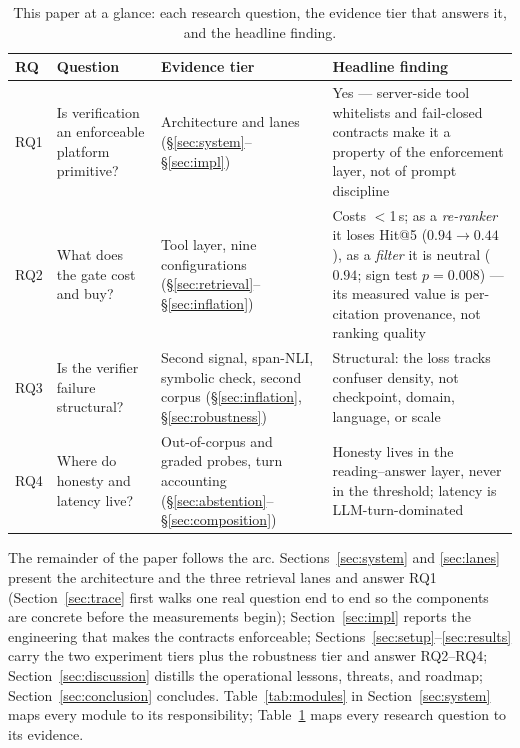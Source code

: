 \begin{table}[!htbp]
\centering
\footnotesize
\setlength{\tabcolsep}{3pt}
\caption{This paper at a glance: each research question, the evidence tier
that answers it, and the headline finding.}
\label{tab:ataglance}
\begin{tabular}{p{0.75cm}p{4.0cm}p{2.6cm}p{5.3cm}}
\toprule
RQ & Question & Evidence tier & Headline finding \\
\midrule
RQ1 & Is verification an enforceable platform primitive? & Architecture and
lanes (\S\ref{sec:system}--\S\ref{sec:impl}) & Yes --- server-side tool
whitelists and fail-closed contracts make it a property of the enforcement
layer, not of prompt discipline \\
RQ2 & What does the gate cost and buy? & Tool layer, nine configurations
(\S\ref{sec:retrieval}--\S\ref{sec:inflation}) & Costs $<$1\,s; as a
\emph{re-ranker} it loses Hit@5 ($0.94\!\to\!0.44$), as a \emph{filter} it is
neutral ($0.94$; sign test $p=0.008$) --- its measured value is per-citation
provenance, not ranking quality \\
RQ3 & Is the verifier failure structural? & Second signal, span-NLI, symbolic
check, second corpus (\S\ref{sec:inflation}, \S\ref{sec:robustness}) &
Structural: the loss tracks confuser density, not checkpoint, domain,
language, or scale \\
RQ4 & Where do honesty and latency live? & Out-of-corpus and graded probes,
turn accounting (\S\ref{sec:abstention}--\S\ref{sec:composition}) & Honesty
lives in the reading--answer layer, never in the threshold; latency is
LLM-turn-dominated \\
\bottomrule
\end{tabular}
\end{table}

The remainder of the paper follows the arc.
Sections~\ref{sec:system} and \ref{sec:lanes} present the architecture and
the three retrieval lanes and answer RQ1 (Section~\ref{sec:trace} first walks
one real question end to end so the components are concrete before the
measurements begin); Section~\ref{sec:impl} reports the engineering that makes
the contracts enforceable; Sections~\ref{sec:setup}--\ref{sec:results} carry
the two experiment tiers plus the robustness tier and answer RQ2--RQ4;
Section~\ref{sec:discussion} distills the operational lessons, threats, and
roadmap; Section~\ref{sec:conclusion} concludes.
Table~\ref{tab:modules} in Section~\ref{sec:system} maps every module to its
responsibility; Table~\ref{tab:ataglance} maps every research question to its
evidence.

